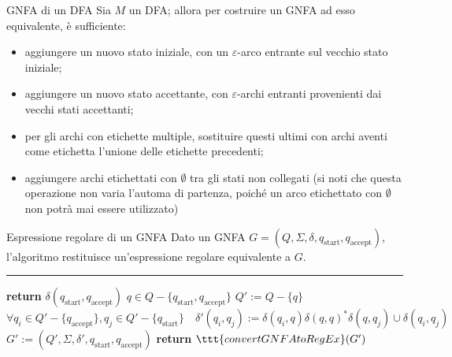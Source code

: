 \documentclass[a4paper, 12pt]{report}
\begin{document}
    \begin{framedmeth}[label={dfa into gnfa}]{GNFA di un DFA}
        Sia $M$ un DFA; allora per costruire un GNFA ad esso equivalente, è sufficiente:

        \begin{itemize}
            \item aggiungere un nuovo stato iniziale, con un $\varepsilon$-arco entrante sul vecchio stato iniziale;
            \item aggiungere un nuovo stato accettante, con $\varepsilon$-archi entranti provenienti dai vecchi stati accettanti;
            \item per gli archi con etichette multiple, sostituire questi ultimi con archi aventi come etichetta l'unione delle etichette precedenti;
            \item aggiungere archi etichettati con $\emptyset$ tra gli stati non collegati (si noti che questa operazione non varia l'automa di partenza, poiché un arco etichettato con $\emptyset$ non potrà mai essere utilizzato)
        \end{itemize}
    \end{framedmeth}

    \begin{framedalgo}[label={gnfa into regex}]{Espressione regolare di un GNFA}
        Dato un GNFA $G = (Q, \Sigma, \delta, q_{\mathrm{start}}, q_{\mathrm{accept}})$, l'algoritmo restituisce un'espressione regolare equivalente a $G$.

        \hrule
        \begin{algorithmic}[1]
                \State \textbf{return} $\delta(q_{\mathrm{start}}, q_{\mathrm{accept}})$
                    \State $q \in Q - \{q_{\mathrm{start}}, q_{\mathrm{accept}}\}$
                    \State $Q' := Q - \{q\}$
                    \State $\forall q_i \in Q' - \{q_{\mathrm{accept}}\}, q_j \in Q' - \{q_{\mathrm{start}}\} \quad \delta'(q_i, q_j) := \delta(q_i, q)\delta(q, q)^* \delta(q, q_j) \cup \delta(q_i, q_j)$
                    \State $G' := (Q', \Sigma, \delta', q_{\mathrm{start}}, q_{\mathrm{accept}})$
                    \State \textbf{return} $\ttt{convertGNFAtoRegEx}(G')$
                \EndIf
            \EndFunction
        \end{algorithmic}
    \end{framedalgo}
\end{document}
